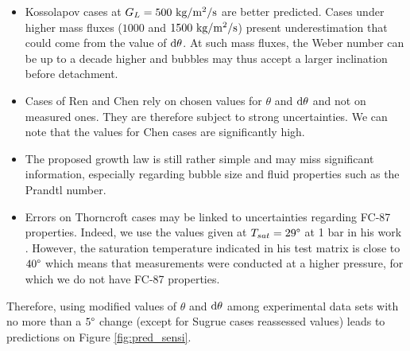 \begin{itemize}
\item Kossolapov cases at $G_{L}=500~\text{kg/m$^{2}$/s}$ are better predicted. Cases under higher mass fluxes ($1000$ and $1500~\text{kg/m$^{2}$/s}$) present underestimation that could come from the value of $\mathrm{d}\theta$. At such mass fluxes, the Weber number can be up to a decade higher and bubbles may thus accept a larger inclination before detachment.

\item Cases of Ren and Chen rely on chosen values for $\theta$ and $\mathrm{d}\theta$ and not on measured ones. They are therefore subject to strong uncertainties. We can note that the values for Chen cases are significantly high.

\item The proposed growth law is still rather simple and may miss significant information, especially regarding bubble size and fluid properties such as the Prandtl number.

\item Errors on Thorncroft cases may be linked to uncertainties regarding FC-87 properties. Indeed, we use the values given at $T_{sat}=29\degree$ at 1 bar in his work \cite{thorncroft_experimental_1998}. However, the saturation temperature indicated in his test matrix is close to $40\degree$ which means that measurements were conducted at a higher pressure, for which we do not have FC-87 properties.


\end{itemize}





Therefore, using modified values of $\theta$ and $\mathrm{d}\theta$ among experimental data sets with no more than a $5 \degree$ change (except for Sugrue cases reassessed values) leads to predictions on Figure \ref{fig:pred_sensi}.







